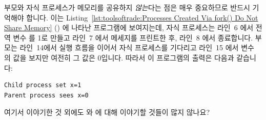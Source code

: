 부모와 자식 프로세스가 메모리를 공유하지 \emph{않는}다는 점은 매우 중요하므로
반드시 기억해야 합니다.
이는 Listing~\ref{lst:toolsoftrade:Processes Created Via fork() Do Not Share Memory}
() 에 나타난 프로그램에 보여지는데, 자식 프로세스는 라인~6
에서 전역 변수  를 1로 만들고 라인~7 에서 메세지를 프린트한 후, 라인~8
에서 종료합니다.
부모는 라인~14에서 실행 흐름을 이어서 자식 프로세스를 기다리고 라인~15 에서
변수  의 값을 보지만 여전히 그 값은 0입니다.
따라서 이 프로그램의 출력은 다음과 같습니다:

\vspace{5pt}
\begin{minipage}[t]{\columnwidth}
\scriptsize
\begin{verbatim}
Child process set x=1
Parent process sees x=0
\end{verbatim}
\end{minipage}
\vspace{5pt}

\QuickQuiz{}
	여기서 이야기한 것 외에도  와  에 대해 이야기할
	것들이 많지 않나요?

